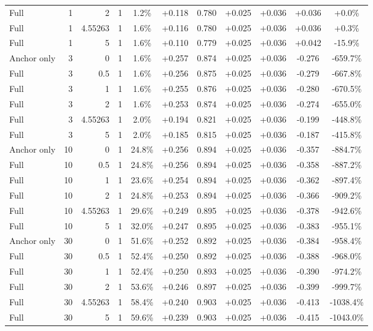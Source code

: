 \begin{table}[htbp]
\begin{tabular}{lrrrccccccc}
Full & 1 & 2 & 1 & 1.2\% & +0.118 & 0.780 & +0.025 & +0.036 & +0.036 & +0.0\% \\
Full & 1 & 4.55263 & 1 & 1.6\% & +0.116 & 0.780 & +0.025 & +0.036 & +0.036 & +0.3\% \\
Full & 1 & 5 & 1 & 1.6\% & +0.110 & 0.779 & +0.025 & +0.036 & +0.042 & -15.9\% \\
Anchor only & 3 & 0 & 1 & 1.6\% & +0.257 & 0.874 & +0.025 & +0.036 & -0.276 & -659.7\% \\
Full & 3 & 0.5 & 1 & 1.6\% & +0.256 & 0.875 & +0.025 & +0.036 & -0.279 & -667.8\% \\
Full & 3 & 1 & 1 & 1.6\% & +0.255 & 0.876 & +0.025 & +0.036 & -0.280 & -670.5\% \\
Full & 3 & 2 & 1 & 1.6\% & +0.253 & 0.874 & +0.025 & +0.036 & -0.274 & -655.0\% \\
Full & 3 & 4.55263 & 1 & 2.0\% & +0.194 & 0.821 & +0.025 & +0.036 & -0.199 & -448.8\% \\
Full & 3 & 5 & 1 & 2.0\% & +0.185 & 0.815 & +0.025 & +0.036 & -0.187 & -415.8\% \\
Anchor only & 10 & 0 & 1 & 24.8\% & +0.256 & 0.894 & +0.025 & +0.036 & -0.357 & -884.7\% \\
Full & 10 & 0.5 & 1 & 24.8\% & +0.256 & 0.894 & +0.025 & +0.036 & -0.358 & -887.2\% \\
Full & 10 & 1 & 1 & 23.6\% & +0.254 & 0.894 & +0.025 & +0.036 & -0.362 & -897.4\% \\
Full & 10 & 2 & 1 & 24.8\% & +0.253 & 0.894 & +0.025 & +0.036 & -0.366 & -909.2\% \\
Full & 10 & 4.55263 & 1 & 29.6\% & +0.249 & 0.895 & +0.025 & +0.036 & -0.378 & -942.6\% \\
Full & 10 & 5 & 1 & 32.0\% & +0.247 & 0.895 & +0.025 & +0.036 & -0.383 & -955.1\% \\
Anchor only & 30 & 0 & 1 & 51.6\% & +0.252 & 0.892 & +0.025 & +0.036 & -0.384 & -958.4\% \\
Full & 30 & 0.5 & 1 & 52.4\% & +0.250 & 0.892 & +0.025 & +0.036 & -0.388 & -968.0\% \\
Full & 30 & 1 & 1 & 52.4\% & +0.250 & 0.893 & +0.025 & +0.036 & -0.390 & -974.2\% \\
Full & 30 & 2 & 1 & 53.6\% & +0.246 & 0.897 & +0.025 & +0.036 & -0.399 & -999.7\% \\
Full & 30 & 4.55263 & 1 & 58.4\% & +0.240 & 0.903 & +0.025 & +0.036 & -0.413 & -1038.4\% \\
Full & 30 & 5 & 1 & 59.6\% & +0.239 & 0.903 & +0.025 & +0.036 & -0.415 & -1043.0\% \\

\end{tabular}
\end{table}

